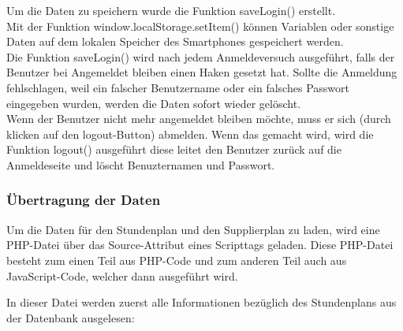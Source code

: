 Um die Daten zu speichern wurde die Funktion saveLogin() erstellt.\\




Mit der Funktion window.localStorage.setItem() können Variablen oder sonstige Daten auf dem lokalen Speicher des Smartphones gespeichert werden.\\
 Die Funktion saveLogin() wird nach jedem Anmeldeversuch ausgeführt, falls der Benutzer bei Angemeldet bleiben einen Haken gesetzt hat. Sollte die Anmeldung fehlschlagen, weil ein falscher Benutzername oder ein falsches Passwort eingegeben wurden, werden die Daten sofort wieder gelöscht.\\
Wenn der Benutzer nicht mehr angemeldet bleiben möchte, muss er sich (durch klicken auf den logout-Button) abmelden. Wenn das gemacht wird, wird die Funktion logout() ausgeführt diese leitet den Benutzer zurück auf die Anmeldeseite und löscht Benuzternamen und Passwort.\\



\subsubsection{Übertragung der Daten}

Um die Daten für den Stundenplan und den Supplierplan zu laden, wird eine PHP-Datei über das Source-Attribut eines Scripttags geladen. Diese PHP-Datei besteht zum einen Teil aus PHP-Code und zum anderen Teil auch aus JavaScript-Code, welcher dann ausgeführt wird.



In dieser Datei werden zuerst alle Informationen bezüglich des Stundenplans aus der Datenbank ausgelesen:



